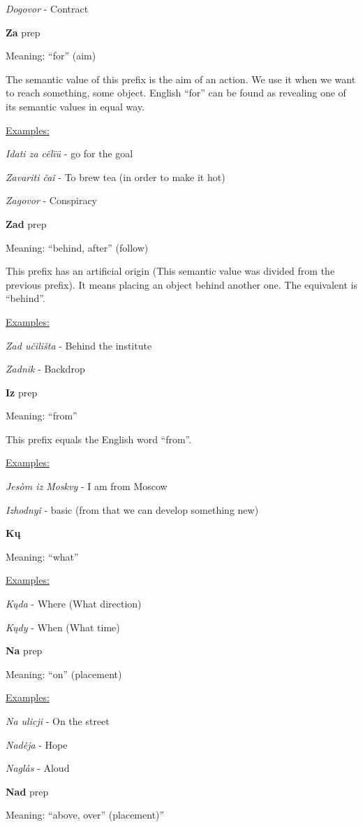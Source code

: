 \textit{Dogovor} - Contract

\textbf{Za} \gls{prep}

Meaning: “for” (aim)

The semantic value of this prefix is the aim of an action. We use it when we want to reach something, some object. English “for” can be found as revealing one of its semantic values in equal way. 

\underline{Examples:}

\textit{Idati za cělïü} - go for the goal

\textit{Zavariti čaǐ }- To brew tea (in order to make it hot)

\textit{Zagovor} - Conspiracy

\textbf{Zad} \gls{prep}

Meaning: “behind, after” (follow)

This prefix has an artificial origin (This semantic value was divided from the previous prefix). It means placing an object behind another one. The equivalent is “behind”.

\underline{Examples:}

\textit{Zad učilišta} - Behind the institute

\textit{Zadnik} - Backdrop

\textbf{Iz} \gls{prep}

Meaning: “from”

This prefix equals the English word “from”. 

\underline{Examples:}

\textit{Jesòm iz Moskvy} - I am from Moscow

\textit{Izhodnyǐ} - basic (from that we can develop something new)

\textbf{Kų}

Meaning: “what”

\underline{Examples:}

\textit{Kųda} - Where (What direction)

\textit{Kųdy} - When (What time) 

\textbf{Na} \gls{prep}

Meaning: “on” (placement)

\underline{Examples:}

\textit{Na ulicji} - On the street

\textit{Naděja} - Hope

\textit{Naglås} - Aloud

\textbf{Nad} \gls{prep}

Meaning: “above, over” (placement)”

